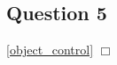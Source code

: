 \documentclass{article}
\begin{document}
\begin{exe}
{%
}
\end{exe}

\subsection*{Question 5}
\hfill{}
\ref{object_control} $\Box$%
\end{document}
